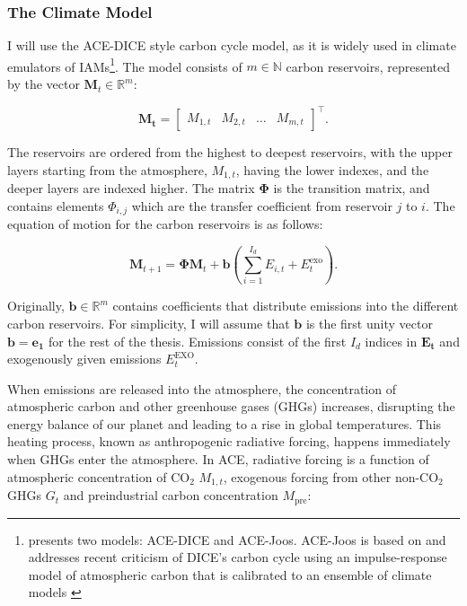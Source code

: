 \subsubsection{The Climate Model}

I will use the ACE-DICE style carbon cycle model, as it is widely used in climate emulators of IAMs\footnote{\textcite{TraegerChristian2023ACE} presents two models: ACE-DICE and ACE-Joos. ACE-Joos is based on \textcite{Joos2013impulseresp} and addresses recent criticism of DICE's carbon cycle using an impulse-response model of atmospheric carbon that is calibrated to an ensemble of climate models \parencite{Taylor2012cmip5}}. The model consists of \(m\in\mathbb{N}\) carbon reservoirs, represented by the vector \(\bm{M}_t \in \mathbb{R}^m\):

\begin{equation}
    \bm{M_t} = \begin{bmatrix}
    M_{1,t} & M_{2,t} & \dots & M_{m,t}
\end{bmatrix}^\top .
\end{equation}

The reservoirs are ordered from the highest to deepest reservoirs, with the upper layers starting from the atmosphere, \(M_{1,t}\), having the lower indexes, and the deeper layers are indexed higher. The matrix \(\bm{\Phi}\) is the transition matrix, and contains elements \(\Phi_{i,j}\) which are the transfer coefficient from reservoir \(j\) to \(i\). The equation of motion for the carbon reservoirs is as follows:

\begin{equation}
    \bm{M}_{t+1} = \bm{\Phi}\bm{M}_t + \bm{b} \left(\sum_{i=1}^{I_d} E_{i,t} + E^{\text{exo}}_t \right) .
\end{equation}

Originally, \(\bm{b} \in \mathbb{R}^m\) contains coefficients that distribute emissions into the different carbon reservoirs. For simplicity, I will assume that \(\bm{b}\) is the first unity vector \(\bm{b} = \bm{e_1}\) for the rest of the thesis. Emissions consist of the first \(I_d\) indices in \(\bm{E_t}\) and exogenously given emissions \(E_t^{\text{EXO}}\). 

When emissions are released into the atmosphere, the concentration of atmospheric carbon and other greenhouse gases (GHGs) increases, disrupting the energy balance of our planet and leading to a rise in global temperatures. This heating process, known as anthropogenic radiative forcing, happens immediately when GHGs enter the atmosphere. In ACE, radiative forcing is a function of atmospheric concentration of CO$_2$ \(M_{1,t}\), exogenous forcing from other non-CO$_2$ GHGs \(G_t\) and preindustrial carbon concentration \(M_{\text{pre}}\):

